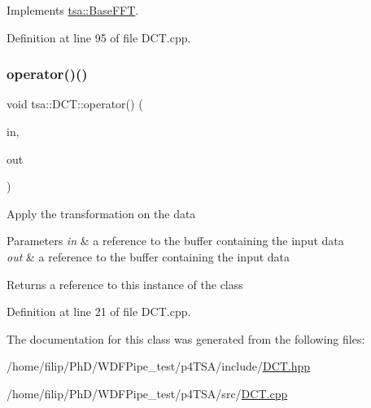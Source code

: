 Implements \hyperlink{classtsa_1_1_base_f_f_t_a9af0c36413173821cac8dbdce9cfe3b4}{tsa\+::\+Base\+F\+FT}.



Definition at line 95 of file D\+C\+T.\+cpp.

\mbox{\label{classtsa_1_1_d_c_t_a594c2f0240e0b7b4d736c498732b5bfb}} 
\subsubsection{\texorpdfstring{operator()()}{operator()()}}
{\footnotesize\ttfamily void tsa\+::\+D\+C\+T\+::operator() (\begin{DoxyParamCaption}\item[{\hyperlink{namespacetsa_ac599574bcc094eda25613724b8f3ca9e}{Seq\+View\+Double} \&}]{in,  }\item[{\hyperlink{namespacetsa_ac599574bcc094eda25613724b8f3ca9e}{Seq\+View\+Double} \&}]{out }\end{DoxyParamCaption})}

Apply the transformation on the data


\begin{DoxyParams}{Parameters}
{\em in} & a reference to the buffer containing the input data \\
\hline
{\em out} & a reference to the buffer containing the input data\\
\hline
\end{DoxyParams}
\begin{DoxyReturn}{Returns}
a reference to this instance of the class 
\end{DoxyReturn}


Definition at line 21 of file D\+C\+T.\+cpp.



The documentation for this class was generated from the following files\+:\begin{DoxyCompactItemize}
\item 
/home/filip/\+Ph\+D/\+W\+D\+F\+Pipe\+\_\+test/p4\+T\+S\+A/include/\hyperlink{_d_c_t_8hpp}{D\+C\+T.\+hpp}\item 
/home/filip/\+Ph\+D/\+W\+D\+F\+Pipe\+\_\+test/p4\+T\+S\+A/src/\hyperlink{_d_c_t_8cpp}{D\+C\+T.\+cpp}\end{DoxyCompactItemize}
